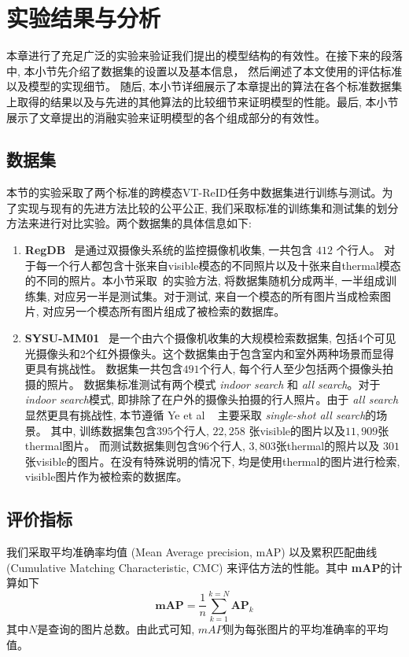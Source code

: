 \section{实验结果与分析}
本章进行了充足广泛的实验来验证我们提出的模型结构的有效性。在接下来的段落中, 本小节先介绍了数据集的设置以及基本信息， 然后阐述了本文使用的评估标准以及模型的实现细节。 随后, 本小节详细展示了本章提出的算法在各个标准数据集上取得的结果以及与先进的其他算法的比较细节来证明模型的性能。最后, 本小节展示了文章提出的消融实验来证明模型的各个组成部分的有效性。
\subsection{数据集}
本节的实验采取了两个标准的跨模态VT-ReID任务中数据集进行训练与测试。为了实现与现有的先进方法比较的公平公正, 我们采取标准的训练集和测试集的划分方法来进行对比实验。两个数据集的具体信息如下:
\begin{enumerate}
  \item \textbf{RegDB}~\cite{nguyen2017person} 是通过双摄像头系统的监控摄像机收集, 一共包含 $412$ 个行人。 对于每一个行人都包含十张来自visible模态的不同照片以及十张来自thermal模态的不同的照片。本小节采取~\cite{ye2018hierarchical}的实验方法, 将数据集随机分成两半, 一半组成训练集, 对应另一半是测试集。对于测试, 来自一个模态的所有图片当成检索图片, 对应另一个模态所有图片组成了被检索的数据库。 
  \item \textbf{SYSU-MM01}~\cite{wu2017rgb} 是一个由六个摄像机收集的大规模检索数据集, 包括4个可见光摄像头和2个红外摄像头。这个数据集由于包含室内和室外两种场景而显得更具有挑战性。 数据集一共包含$491$个行人, 每个行人至少包括两个摄像头拍摄的照片。 数据集标准测试有两个模式 \textit{indoor search} 和 \textit{all search}。对于 \textit{indoor search}模式, 即排除了在户外的摄像头拍摄的行人照片。由于 \textit{all search}显然更具有挑战性, 本节遵循 Ye et al ~\cite{ye2018visible} 主要采取 \textit{single-shot all search}的场景。 其中, 训练数据集包含$395$个行人, $22,258$ 张visible的图片以及$11,909$张thermal图片。 而测试数据集则包含$96$个行人, $3,803$张thermal的照片以及 $301$张visible的图片。在没有特殊说明的情况下, 均是使用thermal的图片进行检索, visible图片作为被检索的数据库。
\end{enumerate}
\subsection{评价指标}
我们采取平均准确率均值 (Mean Average precision, mAP) 以及累积匹配曲线 (Cumulative Matching Characteristic, CMC) 来评估方法的性能。其中 \textbf{mAP}的计算如下
\begin{equation}
   \textbf{mAP} = \frac{1}{n} \sum_{k=1}^{k= N} \textbf{AP}_k
\end{equation}
其中$N$是查询的图片总数。由此式可知, $mAP$则为每张图片的平均准确率的平均值。
